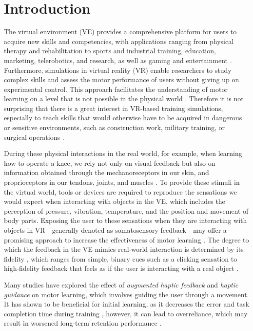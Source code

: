 
\section{Introduction}
The virtual environment (VE) provides a comprehensive platform for users to acquire new skills and competencies, with applications ranging from physical therapy and rehabilitation to sports and industrial training, education, marketing, telerobotics, and research, as well as gaming and entertainment \cite{Wu2023TrainingReality, Oagaz2022PerformanceReality}. 
Furthermore, simulations in virtual reality (VR) enable researchers to study complex skills and assess the motor performance of users without giving up on experimental control. This approach facilitates the understanding of motor learning on a level that is not possible in the physical world \cite{Harris2021ExploringSimulator, Levac2019LearningReview}. 
Therefore it is not surprising that there is a great interest in VR-based training simulations, especially to teach skills that would otherwise have to be acquired in dangerous or sensitive environments, such as construction work, military training, or surgical operations \cite{Adami2021EffectivenessTeleoperation, Lele2013VirtualUtility, Qi2021VirtualScenario}.

During these physical interactions in the real world, for example, when learning how to operate a knee, we rely not only on visual feedback but also on information obtained through the mechanoreceptors in our skin, and proprioceptors in our tendons, joints, and muscles \cite{Gonzalez-Grandon2021ProprioceptionInteraction}. To provide these stimuli in the virtual world, tools or devices are required to reproduce the sensations we would expect when interacting with objects in the VE, which includes the perception of pressure, vibration, temperature, and the position and movement of body parts. Exposing the user to these sensations when they are interacting with objects in VR---generally denoted as somatosensory feedback---may offer a promising approach to increase the effectiveness of motor learning \cite{Sigrist2013AugmentedReview}. 
The degree to which the feedback in the VE mimics real-world interaction is determined by its fidelity \cite{Caird1996PersistentTraining}, which ranges from simple, binary cues such as a clicking sensation to high-fidelity feedback that feels as if the user is interacting with a real object \cite{Yang2023}.

Many studies have explored the effect of \textit{augmented haptic feedback} and \textit{haptic guidance} on motor learning, which involves guiding the user through a movement. It has shown to be beneficial for initial learning, as it decreases the error and task completion time during training \cite{Caccianiga2021, LeeH2014, Fehlberg2012}, however, it can lead to overreliance, which may result in worsened long-term retention performance \cite{Oquendo2024}. 

